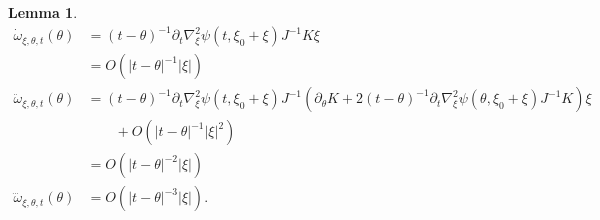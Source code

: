 \documentclass[12pt]{amsart}
\numberwithin{equation}{section}
\newtheorem{lemma}{Lemma}[section]
\newcommand{\1}{\mathbbm{1}}
\newcommand{\xixi}{\xi_0 + \xi}
\begin{document}
\begin{lemma}\label{lem: formulas for omega}
    \begin{align}
        \dot \omega_{\xi, \theta, t}(\theta) &= (t - \theta)^{-1} \partial_t \nabla_\xi^2 \psi(t, \xixi) J^{-1} K \xi \\
        &= O(|t - \theta|^{-1} |\xi|) \\
        \ddot \omega_{\xi,\theta, t}(\theta) &= (t - \theta)^{-1} \partial_t \nabla_\xi^2 \psi(t, \xixi) J^{-1}(\partial_\theta K + 2(t - \theta)^{-1} \partial_t \nabla_\xi^2 \psi(\theta, \xixi) J^{-1} K)\xi \\& \qquad+ O(|t - \theta|^{-1} |\xi|^2) \nonumber \\
        &= O(|t - \theta|^{-2} |\xi|)\\
        \dddot \omega_{\xi, \theta,t}(\theta) &= O(|t - \theta|^{-3} |\xi|). 
    \end{align}
\end{lemma}
\end{document}
